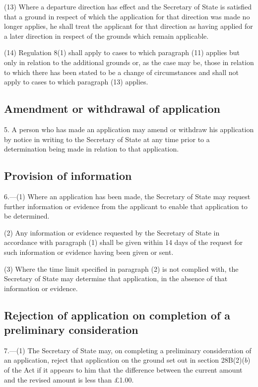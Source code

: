 \documentclass[a4paper]{article}
\begin{document}
(13) Where a departure direction has effect and the Secretary of State is
satisfied that a ground in respect of which the application for that direction
was made no longer applies, he shall treat the applicant for that direction as
having applied for a later direction in respect of the grounds which remain
applicable.

(14) Regulation 8(1) shall apply to cases to which paragraph (11) applies but
only in relation to the additional grounds or, as the case may be, those in
relation to which there has been stated to be a change of circumstances and
shall not apply to cases to which paragraph (13) applies.

\subsection[5. Amendment or withdrawal of application]{Amendment or withdrawal of application}

5. A person who has made an application
may amend or withdraw his application by notice in writing to the Secretary of
State at any time prior to a determination being made in relation to that
application.

\subsection[6. Provision of information]{Provision of information}

6.—(1) Where an application has been made, the Secretary
of State may request further information or evidence from the applicant to
enable that application to be determined.

(2) Any information or evidence requested by the Secretary of State in
accordance with paragraph (1) shall be given within 14 days of the request for
such information or evidence having been given or sent.

(3) Where the time limit specified in paragraph (2) is not complied with, the
Secretary of State may determine that application, in the absence of that
information or evidence.

\subsection[7. Rejection of application on completion of a preliminary consideration]{Rejection of application on completion of a preliminary consideration}

7.—(1) The
Secretary of State may, on completing a preliminary consideration of an
application, reject that application on the ground set out in section 28B(2)($b$)
of the Act if it appears to him that the difference between the current amount
and the revised amount is less than £1.00.
\end{document}
